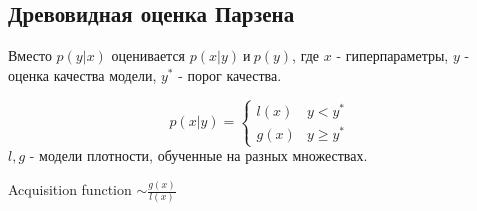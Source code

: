 \subsection*{Древовидная оценка Парзена}

Вместо $p(y | x)$ оценивается $p(x|y)\ и\ p(y)$,
где $x$ - гиперпараметры, $y$ - оценка качества модели,
$y^*$ - порог качества.

\begin{equation}
    p(x | y) = 
    \begin{cases}
        l(x) & y < y^* \\
        g(x) & y \geq y^*
    \end{cases}
\end{equation}
$l, g$ - модели плотности, обученные на разных множествах.

Acquisition function $\sim \frac{g(x)}{l(x)}$